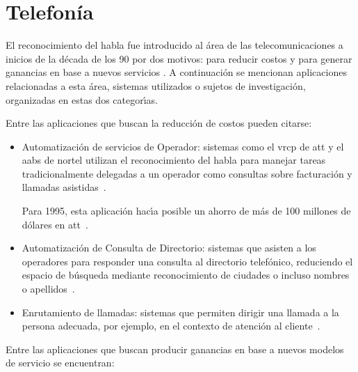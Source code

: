 \section{Telefon\'ia}
\label{sec:telefonia}

El reconocimiento del habla fue introducido al \'area de las telecomunicaciones a inicios de la d\'ecada
de los 90 por dos motivos: para reducir costos y para generar ganancias en base a nuevos servicios \cite{RabinerApplications1997}.
A continuaci\'on se mencionan aplicaciones relacionadas a esta \'area, sistemas utilizados o sujetos de investigaci\'on, 
organizadas en estas dos categor{\'\i}as. 

Entre las aplicaciones que buscan la reducci\'on de costos pueden citarse:

\begin{itemize}
	\item  Automatizaci\'on de servicios de Operador: sistemas como el \gls{vrcp} de \gls{att} 
	y el \gls{aabs} de \gls{nortel} utilizan el reconocimiento del habla para manejar tareas tradicionalmente delegadas
	a un operador como consultas sobre facturaci\'on y llamadas \mbox{asistidas \cite{RabinerApplications1997}}.

	Para 1995, esta aplicaci\'on hac{\'\i}a posible un ahorro de m\'as de 100 millones de d\'olares 
	en \mbox{\gls{att} \cite{WilponApplications1994}}.

	\item Automatizaci\'on de Consulta de Directorio: sistemas que asisten a los operadores
	para responder una consulta al directorio telef\'onico, reduciendo el espacio de b\'usqueda mediante
	reconocimiento de ciudades o incluso nombres o \mbox{apellidos \cite{RabinerApplications1997}}.

	\item Enrutamiento de llamadas: sistemas que permiten dirigir una llamada a la persona adecuada,
	por ejemplo, en el contexto de atenci\'on al \mbox{cliente \cite{Sachs97howmay}}.
\end{itemize}

Entre las aplicaciones que buscan producir ganancias en base a nuevos modelos de servicio se encuentran:

